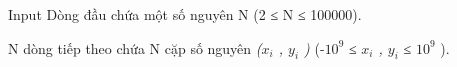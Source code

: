 Input
Dòng đầu chứa một số nguyên       N      (2 ≤       N      ≤ 100000).  

       N      dòng tiếp theo chứa       N      cặp số nguyên   \textit{    ($x_{i}$    , $y_{i}$    )   }   (-$10^{9}$   ≤   \textit{    $x_{i}$    , $y_{i}$}   ≤ $10^{9}$   ).
